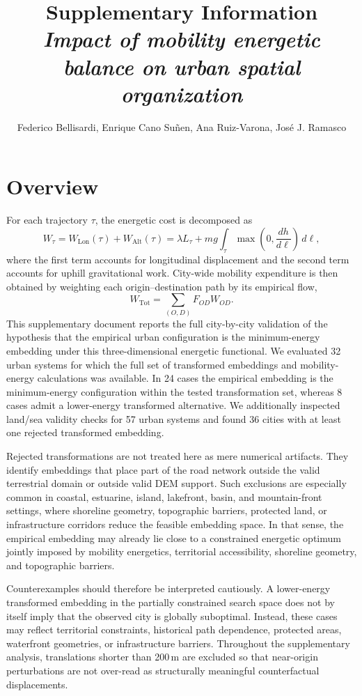 \documentclass{article}
\begin{document}
\title{Supplementary Information\\
\it Impact of mobility energetic balance on urban spatial organization}
\author{Federico Bellisardi, Enrique Cano Su\~nen, Ana Ruiz-Varona, Jos\'e J. Ramasco}
\date{}
\maketitle

\section{Overview}

For each trajectory $\tau$, the energetic cost is decomposed as
\[
W_\tau = W_{\mathrm{Lon}}(\tau) + W_{\mathrm{Alt}}(\tau)
= \lambda L_\tau + m g \int_\tau \max\left(0,\frac{dh}{d\ell}\right)\,d\ell,
\]
where the first term accounts for longitudinal displacement and the second term accounts for uphill gravitational work. City-wide mobility expenditure is then obtained by weighting each origin--destination path by its empirical flow,
\[
W_{\mathrm{Tot}} = \sum_{(O,D)} F_{OD} W_{OD}.
\]
This supplementary document reports the full city-by-city validation of the hypothesis that the empirical urban configuration is the minimum-energy embedding under this three-dimensional energetic functional. We evaluated 32 urban systems for which the full set of transformed embeddings and mobility-energy calculations was available. In 24 cases the empirical embedding is the minimum-energy configuration within the tested transformation set, whereas 8 cases admit a lower-energy transformed alternative. We additionally inspected land/sea validity checks for 57 urban systems and found 36 cities with at least one rejected transformed embedding.

Rejected transformations are not treated here as mere numerical artifacts. They identify embeddings that place part of the road network outside the valid terrestrial domain or outside valid DEM support. Such exclusions are especially common in coastal, estuarine, island, lakefront, basin, and mountain-front settings, where shoreline geometry, topographic barriers, protected land, or infrastructure corridors reduce the feasible embedding space. In that sense, the empirical embedding may already lie close to a constrained energetic optimum jointly imposed by mobility energetics, territorial accessibility, shoreline geometry, and topographic barriers.

Counterexamples should therefore be interpreted cautiously. A lower-energy transformed embedding in the partially constrained search space does not by itself imply that the observed city is globally suboptimal. Instead, these cases may reflect territorial constraints, historical path dependence, protected areas, waterfront geometries, or infrastructure barriers. Throughout the supplementary analysis, translations shorter than 200\,m are excluded so that near-origin perturbations are not over-read as structurally meaningful counterfactual displacements.
\end{document}
